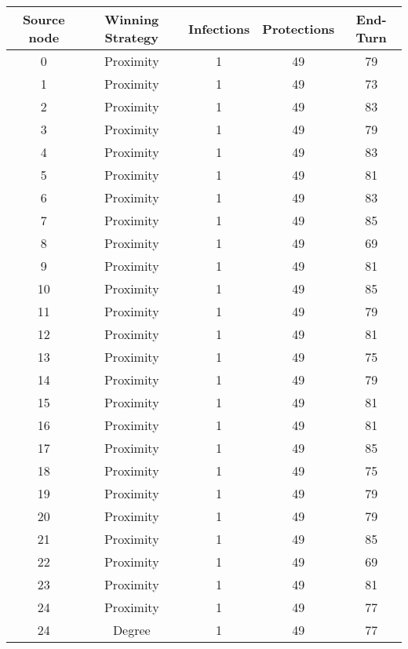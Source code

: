 \documentclass[results.tex]{subfiles}
\begin{document}
\begin{center}
  \begin{tabular}{| c || c | c | c | c |}
    \hline
    {\bfseries Source node} & {\bfseries Winning Strategy} & {\bfseries Infections} & {\bfseries Protections} & {\bfseries End-Turn} \\  %
    \hline\hline
    0 & Proximity & 1 & 49 & 79 \\ 
    \hline
    1 & Proximity & 1 & 49 & 73 \\ 
    \hline
    2 & Proximity & 1 & 49 & 83 \\ 
    \hline
    3 & Proximity & 1 & 49 & 79 \\ 
    \hline
    4 & Proximity & 1 & 49 & 83 \\ 
    \hline
    5 & Proximity & 1 & 49 & 81 \\ 
    \hline
    6 & Proximity & 1 & 49 & 83 \\ 
    \hline
    7 & Proximity & 1 & 49 & 85 \\ 
    \hline
    8 & Proximity & 1 & 49 & 69 \\ 
    \hline
    9 & Proximity & 1 & 49 & 81 \\ 
    \hline
    10 & Proximity & 1 & 49 & 85 \\ 
    \hline
    11 & Proximity & 1 & 49 & 79 \\ 
    \hline
    12 & Proximity & 1 & 49 & 81 \\ 
    \hline
    13 & Proximity & 1 & 49 & 75 \\ 
    \hline
    14 & Proximity & 1 & 49 & 79 \\ 
    \hline
    15 & Proximity & 1 & 49 & 81 \\ 
    \hline
    16 & Proximity & 1 & 49 & 81 \\ 
    \hline
    17 & Proximity & 1 & 49 & 85 \\ 
    \hline
    18 & Proximity & 1 & 49 & 75 \\ 
    \hline
    19 & Proximity & 1 & 49 & 79 \\ 
    \hline
    20 & Proximity & 1 & 49 & 79 \\ 
    \hline
    21 & Proximity & 1 & 49 & 85 \\ 
    \hline
    22 & Proximity & 1 & 49 & 69 \\ 
    \hline
    23 & Proximity & 1 & 49 & 81 \\ 
    \hline
    24 & Proximity & 1 & 49 & 77 \\ 
    \hline
    24 & Degree & 1 & 49 & 77 \\ 

\end{tabular}
\end{center}
\end{document}
